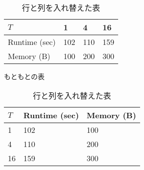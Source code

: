\documentclass[uplatex,onecolumn,9pt,dvipdfmx]{jsarticle}
\begin{document}
\begin{table}[h]
    \begin{minipage}{0.48\linewidth}
        \centering
        \begin{tabular}{@{}llll@{}} \toprule
            $T$ & 1 & 4 & 16 \\ \midrule
            Runtime (sec)       & 102 & 110 & 159 \\ 
            Memory (B)  & 100 & 200 & 300 \\ \bottomrule   
        \end{tabular}
        \caption{もともとの表}
        \label{tbl:use_case8}
    \end{minipage}
    \hfill
    \begin{minipage}{0.48\linewidth}
        \centering
        \begin{tabular}{@{}lll@{}} \toprule
            $T$ & Runtime (sec) & Memory (B) \\ \midrule 
            1 & 102 & 100 \\
            4 & 110 & 200 \\
            16 & 159 & 300 \\ \bottomrule 
        \end{tabular}
        \caption{行と列を入れ替えた表}
        \label{tbl:use_case9}
    \end{minipage}
\end{table}
\end{document}
